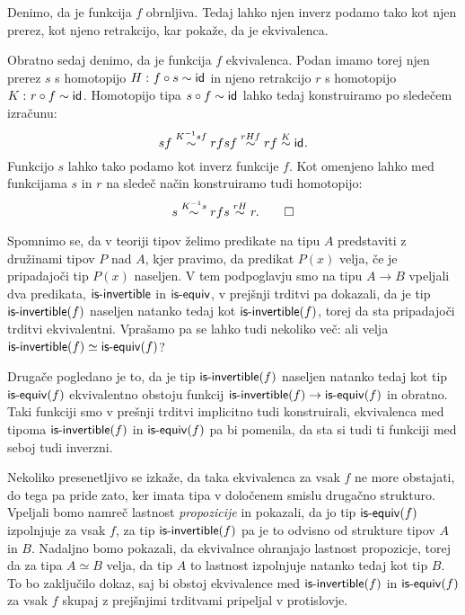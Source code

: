 \begin{dokaz}
  Denimo, da je funkcija \(f\) obrnljiva. Tedaj lahko njen inverz podamo tako kot njen
  prerez, kot njeno retrakcijo, kar pokaže, da je ekvivalenca.

  Obratno sedaj denimo, da je funkcija \(f\) ekvivalenca. Podan imamo torej njen prerez
  \(s\) s homotopijo \(H \,\colon f \circ s \sim \textnormal{\textsf{id}}_{}\) in njeno retrakcijo \(r\) s homotopijo
  \(K \,\colon r \circ f \sim \textnormal{\textsf{id}}_{}\). Homotopijo tipa \(s \circ f \sim \textnormal{\textsf{id}}_{}\) lahko tedaj konstruiramo
  po sledečem izračunu:
  \[s f \overset{K^{-1}sf}{\sim} r f s f \overset{rHf}{\sim} r f \overset{K}{\sim} \textnormal{\textsf{id}}_{}.\]
  Funkcijo \(s\) lahko tako podamo kot inverz funkcije \(f\).
  Kot omenjeno lahko med funkcijama \(s\) in \(r\) na sledeč način konstruiramo tudi homotopijo:
  \[s \overset{K^{-1}s}{\sim} rfs \overset{rH}{\sim} r. \qedhere\]
\end{dokaz}

Spomnimo se, da v teoriji tipov želimo predikate na tipu \(A\) predstaviti z družinami tipov \(P\) nad \(A\), kjer pravimo, da predikat \(P(x)\) velja, če je pripadajoči tip \(P(x)\) naseljen. V tem podpoglavju smo na tipu \(A \to B\) vpeljali dva predikata, \(\textnormal{\textsf{is-invertible}}\) in \(\textnormal{\textsf{is-equiv}}\), v prejšnji trditvi pa dokazali, da je tip \(\textnormal{\textsf{is-invertible}}(f)\) naseljen natanko tedaj kot \(\textnormal{\textsf{is-invertible}}(f)\), torej da sta pripadajoči trditvi ekvivalentni. Vprašamo pa se lahko tudi nekoliko več: ali velja \(\textnormal{\textsf{is-invertible}}(f) \simeq \textnormal{\textsf{is-equiv}}(f)\)?

Drugače pogledano je to, da je tip \(\textnormal{\textsf{is-invertible}}(f)\) naseljen natanko tedaj kot tip \(\textnormal{\textsf{is-equiv}}(f)\) ekvivalentno obstoju funkcij \(\textnormal{\textsf{is-invertible}}(f) \to \textnormal{\textsf{is-equiv}}(f)\) in obratno. Taki funkciji smo v prešnji trditvi implicitno tudi konstruirali, ekvivalenca med tipoma \(\textnormal{\textsf{is-invertible}}(f)\) in \(\textnormal{\textsf{is-equiv}}(f)\) pa bi pomenila, da sta si tudi ti funkciji med seboj tudi inverzni.

Nekoliko presenetljivo se izkaže, da taka ekvivalenca za vsak \(f\) ne more obstajati, do tega pa pride zato, ker imata tipa v določenem smislu drugačno strukturo. Vpeljali bomo namreč lastnost \emph{propozicije} in pokazali, da jo tip \(\textnormal{\textsf{is-equiv}}(f)\) izpolnjuje za vsak \(f\), za tip \(\textnormal{\textsf{is-invertible}}(f)\) pa je to odvisno od strukture tipov \(A\) in \(B\). Nadaljno bomo pokazali, da ekvivalnce ohranjajo lastnost propozicje, torej da za tipa \(A \simeq B\) velja, da tip \(A\) to lastnost izpolnjuje natanko tedaj kot tip \(B\). To bo zaključilo dokaz, saj bi obstoj ekvivalence med \(\textnormal{\textsf{is-invertible}}(f)\) in \(\textnormal{\textsf{is-equiv}}(f)\) za vsak \(f\) skupaj z prejšnjimi trditvami pripeljal v protislovje.

